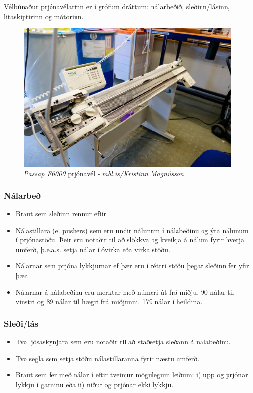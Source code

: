 Vélbúnaður prjónavélarinn er í grófum dráttum:  nálarbeðið, sleðinn/lásinn, litaskiptirinn og mótorinn.

\begin{figure}
    \centering
    \includegraphics[width=.7\linewidth]{myndir/elli/e6000.jpg}
    \caption{\textit{Passap E6000} prjónavél - \textit{mbl.is/Kristinn Magnússon}}
    \label{fig:e6000}
\end{figure}
\subsubsection{Nálarbeð}
\begin{itemize}
    \item Braut sem sleðinn rennur eftir
    \item Nálastillara (e. pushers) sem eru undir nálunum í nálabeðinu og ýta nálunum í prjónastöðu. 
    Þeir eru notaðir til að slökkva og kveikja á nálum fyrir hverja umferð, þ.e.a.s. setja nálar í óvirka eða virka stöðu.
    \item Nálarnar sem prjóna lykkjurnar ef þær eru í réttri stöðu þegar sleðinn fer yfir þær.
    \item Nálarnar á nálabeðinu eru merktar með númeri út frá miðju. 90 nálar til vinstri og 89 nálar til hægri frá miðjunni. 179 nálar í heildina.
\end{itemize}
\subsubsection{Sleði/lás}    
    \begin{itemize}
        \item Tvo ljósaskynjara sem eru notaðir til að staðsetja sleðann á nálabeðinu.
        \item Tvo segla sem setja stöðu nálastillaranna fyrir næstu umferð.
        \item Braut sem fer með nálar í eftir tveimur mögulegum leiðum: 
        i) upp og prjónar lykkju í garninu eða ii) niður og prjónar ekki lykkju.
    \end{itemize}
